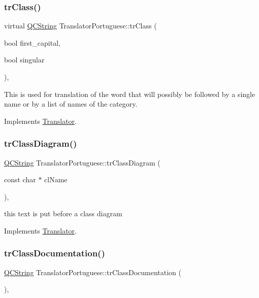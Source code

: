 \subsubsection{\texorpdfstring{trClass()}{trClass()}}
{\footnotesize\ttfamily virtual \mbox{\hyperlink{class_q_c_string}{Q\+C\+String}} Translator\+Portuguese\+::tr\+Class (\begin{DoxyParamCaption}\item[{bool}]{first\+\_\+capital,  }\item[{bool}]{singular }\end{DoxyParamCaption})\hspace{0.3cm}{\ttfamily [inline]}, {\ttfamily [virtual]}}

This is used for translation of the word that will possibly be followed by a single name or by a list of names of the category. 

Implements \mbox{\hyperlink{class_translator}{Translator}}.

\mbox{\label{class_translator_portuguese_a16a9449da5b8b5b9d8d930367ac9e089}} 
\subsubsection{\texorpdfstring{trClassDiagram()}{trClassDiagram()}}
{\footnotesize\ttfamily \mbox{\hyperlink{class_q_c_string}{Q\+C\+String}} Translator\+Portuguese\+::tr\+Class\+Diagram (\begin{DoxyParamCaption}\item[{const char $\ast$}]{cl\+Name }\end{DoxyParamCaption})\hspace{0.3cm}{\ttfamily [inline]}, {\ttfamily [virtual]}}

this text is put before a class diagram 

Implements \mbox{\hyperlink{class_translator}{Translator}}.

\mbox{\label{class_translator_portuguese_ae6f5816122b62bef0dc0090d8970c7b3}} 
\subsubsection{\texorpdfstring{trClassDocumentation()}{trClassDocumentation()}}
{\footnotesize\ttfamily \mbox{\hyperlink{class_q_c_string}{Q\+C\+String}} Translator\+Portuguese\+::tr\+Class\+Documentation (\begin{DoxyParamCaption}{ }\end{DoxyParamCaption})\hspace{0.3cm}{\ttfamily [inline]}, {\ttfamily [virtual]}}

